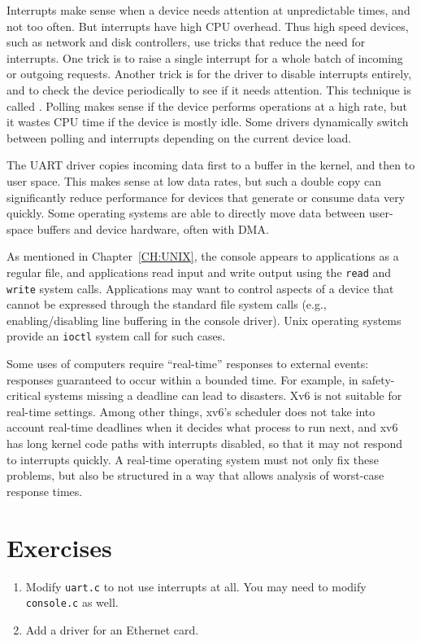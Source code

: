 Interrupts make sense when a device needs attention at unpredictable
times, and not too often. But interrupts have high CPU overhead. Thus
high speed devices, such as network and disk controllers, use tricks
that reduce the need for interrupts. One trick is to raise a single
interrupt for a whole batch of incoming or outgoing requests. Another
trick is for the driver to disable interrupts entirely, and to check
the device periodically to see if it needs attention. This technique
is called . Polling makes sense if the device performs
operations at a high rate, but it wastes CPU time if the device is mostly
idle. Some drivers dynamically switch between polling and interrupts
depending on the current device load.

The UART driver copies incoming data first to a buffer in the kernel,
and then to user space. This makes sense at low data rates, but such a
double copy can significantly reduce performance for devices that
generate or consume data very quickly. Some operating systems are able
to directly move data between user-space buffers and device hardware,
often with DMA.

As mentioned in Chapter~\ref{CH:UNIX}, the console appears to
applications as a regular file, and applications read input and write
output using the \lstinline{read} and \lstinline{write} system calls.
Applications may want to control aspects of a device that cannot be
expressed through the standard file system calls (e.g.,
enabling/disabling line buffering in the console driver).  Unix
operating systems provide an \lstinline{ioctl} system call for such
cases.

Some uses of computers require ``real-time'' responses to external
events: responses guaranteed to occur within a bounded time. For
example, in safety-critical systems missing a deadline can lead to
disasters. Xv6 is not suitable for real-time settings. Among other
things, xv6's scheduler does not take into account real-time deadlines
when it decides what process to run next, and xv6 has long kernel code
paths with interrupts disabled, so that it may not respond to
interrupts quickly. A real-time operating system must not only fix
these problems, but also be structured in a way that allows analysis
of worst-case response times.

\section{Exercises}

\begin{enumerate}

\item Modify {\tt uart.c} to not use interrupts at all. You may need
to modify {\tt console.c} as well.

\item Add a driver for an Ethernet card.

\end{enumerate}
